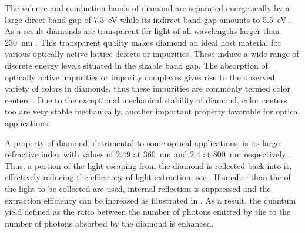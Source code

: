   The valence and conduction bands of diamond are separated energetically by a large direct band gap of \SI{7.3}{\eV} while its indirect band gap amounts to \SI{5.5}{\eV} \cite{Clark1964, Saslow1966}. As a result diamonds are transparent for light of all wavelengths larger than \SI{230}{\nm} \cite{Mildren2008}. This transparent quality makes diamond an ideal host material for various optically active lattice defects or impurities. These induce a wide range of discrete energy levels situated in the sizable band gap. The absorption of optically active impurities or impurity complexes gives rise to the observed variety of colors in diamonds, thus these impurities are commonly termed color centers \cite{Neu2012}. Due to the exceptional mechanical stability of diamond, color centers too are very stable mechanically, another important property favorable for optical applications.

  A property of diamond, detrimental to some optical applications, is its large refractive index with values of $2.49$ at \SI{360}{\nm} and $2.4$ at \SI{800}{\nm} respectively \cite{Zaitsev2001}. Thus, a portion of the light escaping from the diamond is reflected back into it, effectively reducing the efficiency of light extraction, see . If \nds smaller than the \wl of the light to be collected are used, internal reflection is suppressed and the extraction efficiency can be increased \cite{Beveratos2001} as illustrated in . As a result, the quantum yield defined as the ratio between the number of photons emitted by the \siv to the number of photons absorbed by the diamond is enhanced.

